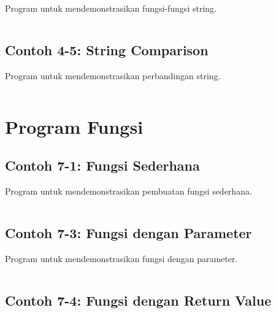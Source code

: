 Program untuk mendemonstrasikan fungsi-fungsi string.

\begin{lstlisting}[language=c++, caption=String Functions]

\end{lstlisting}

\subsection{Contoh 4-5: String Comparison}

Program untuk mendemonstrasikan perbandingan string.

\begin{lstlisting}[language=c++, caption=String Comparison]

\end{lstlisting}

\section{Program Fungsi}

\subsection{Contoh 7-1: Fungsi Sederhana}

Program untuk mendemonstrasikan pembuatan fungsi sederhana.

\begin{lstlisting}[language=c++, caption=Fungsi Sederhana]

\end{lstlisting}

\subsection{Contoh 7-3: Fungsi dengan Parameter}

Program untuk mendemonstrasikan fungsi dengan parameter.

\begin{lstlisting}[language=c++, caption=Fungsi dengan Parameter]

\end{lstlisting}

\subsection{Contoh 7-4: Fungsi dengan Return Value}


